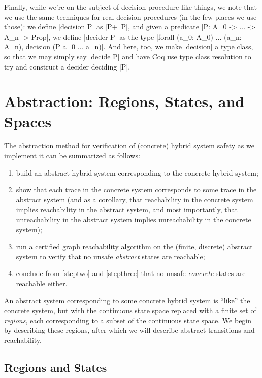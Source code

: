 \documentclass[runningheads]{llncs}
\begin{document}
Finally, while we're on the subject of decision-procedure-like things, we note that we use the same techniques for real decision procedures (in the few places we use those): we define |decision P| as |{P}+{~P}|, and given a predicate |P: A_0 -> ... -> A_n -> Prop|, we define |decider P| as the type |forall (a_0: A_0) ... (a_n: A_n), decision (P a_0 ... a_n)|. And here, too, we make |decision| a type class, so that we may simply say |decide P| and have Coq use type class resolution to try and construct a decider deciding |P|.


\section{Abstraction: Regions, States, and Spaces}
\label{abstraction}

The abstraction method for verification of (concrete) hybrid system safety as we implement it can be summarized as follows:
\begin{enumerate}
\item build an abstract hybrid system corresponding to the concrete hybrid system;
\item \label{steptwo} show that each trace in the concrete system corresponds to some trace in the abstract system (and as a corollary, that reachability in the concrete system implies reachability in the abstract system, and most importantly, that unreachability in the abstract system implies unreachability in the concrete system);
\item \label{stepthree} run a certified graph reachability algorithm on the (finite, discrete) abstract system to verify that no unsafe \emph{abstract} states are reachable;
\item conclude from \ref{steptwo} and \ref{stepthree} that no unsafe \emph{concrete} states are reachable either.
\end{enumerate}

An abstract system corresponding to some concrete hybrid system is ``like'' the concrete system, but with the continuous state space replaced with a finite set of \emph{regions}, each corresponding to a subset of the continuous state space. We begin by describing these regions, after which we will describe abstract transitions and reachability.

\subsection{Regions and States}
\label{regionsandstates}
\end{document}
